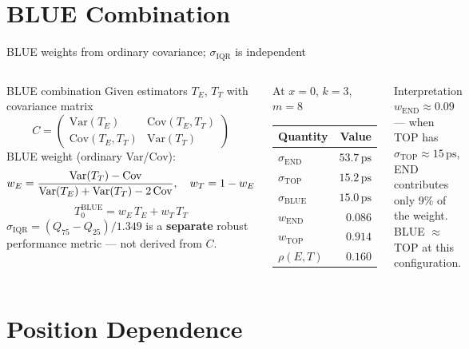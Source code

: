 \documentclass[aspectratio=169,9pt]{beamer}
\newcommand{\sIQR}{\sigma_{\mathrm{IQR}}}
\newcommand{\sEnd}{\sigma_{\mathrm{END}}}
\newcommand{\sTop}{\sigma_{\mathrm{TOP}}}
\newcommand{\sBlu}{\sigma_{\mathrm{BLUE}}}
\newcommand{\ps}{\ensuremath{\,\mathrm{ps}}}
\begin{document}
\section{BLUE Combination}

\begin{frame}{BLUE weights from ordinary covariance; $\sIQR$ is independent}
\begin{columns}[c]
\begin{block}{BLUE combination}
\footnotesize
Given estimators $T_E$, $T_T$ with covariance matrix
\[
C = \begin{pmatrix} \mathrm{Var}(T_E) & \mathrm{Cov}(T_E,T_T) \\
\mathrm{Cov}(T_E,T_T) & \mathrm{Var}(T_T) \end{pmatrix}
\]
BLUE weight (ordinary Var/Cov):
\[
w_E = \frac{\mathrm{Var}(T_T) - \mathrm{Cov}}{%
  \mathrm{Var}(T_E)+\mathrm{Var}(T_T)-2\,\mathrm{Cov}},\quad
w_T = 1-w_E
\]
\[
T_0^{\mathrm{BLUE}} = w_E\,T_E + w_T\,T_T
\]
$\sIQR = (Q_{75}-Q_{25})/1.349$ is a \textbf{separate}
robust performance metric — not derived from $C$.
\end{block}
\begin{block}{At $x=0$, $k=3$, $m=8$}
\small
\begin{tabular}{lr}
\toprule
Quantity & Value \\
\midrule
$\sEnd$ & $53.7\ps$ \\
$\sTop$ & $15.2\ps$ \\
$\sBlu$ & $\mathbf{15.0\ps}$ \\
$w_{\mathrm{END}}$ & $0.086$ \\
$w_{\mathrm{TOP}}$ & $0.914$ \\
$\rho(E,T)$ & $0.160$ \\
\bottomrule
\end{tabular}
\end{block}
\begin{alertblock}{Interpretation}
\small $w_{\mathrm{END}} \approx 0.09$ — when TOP has
$\sTop\approx15\ps$, END contributes only 9\% of the
weight. BLUE $\approx$ TOP at this configuration.
\end{alertblock}
\end{columns}
\end{frame}

\section{Position Dependence}
\end{document}
